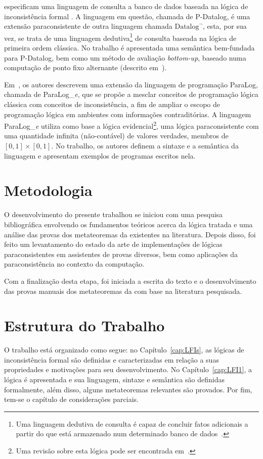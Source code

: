         
         especificam uma linguagem de consulta a banco de dados baseada na lógica de inconsistência formal \lfium{}. A linguagem em questão, chamada de P{-}Datalog, é uma extensão paraconsistente de outra linguagem chamada $\text{Datalog}^{\neg}$, esta, por sua vez, se trata de uma linguagem dedutiva\footnote{Uma linguagem dedutiva de consulta é capaz de concluir fatos adicionais a partir do que está armazenado num determinado banco de dados~\cite{datalog}.} de consulta baseada na lógica de primeira ordem clássica. No trabalho é apresentada uma semântica bem-fundada para P{-}Datalog, bem como um método de avaliação \textit{bottom{-}up}, baseado numa computação de ponto fixo alternante (descrito em~). 
        
        Em~, os autores descrevem uma extensão da linguagem de programação ParaLog, chamada de ParaLog\_\textit{e}, que se propõe a mesclar conceitos de programação lógica clássica com conceitos de inconsistência, a fim de ampliar o escopo de programação lógica em ambientes com informações contraditórias. A linguagem ParaLog\_\textit{e} utiliza como base a lógica evidencial\footnote{Uma revisão sobre esta lógica pode ser encontrada em~.}, uma lógica paraconsistente com uma quantidade infinita (não-contável) de valores verdades, membros de $[0,1] \times [0,1]$. No trabalho, os autores definem a sintaxe e a semântica da linguagem e apresentam exemplos de programas escritos nela.
    
    \section{Metodologia}\label{sec:metodologia}
      O desenvolvimento do presente trabalhou se iniciou com uma pesquisa bibliográfica envolvendo os fundamentos teóricos acerca da lógica tratada e uma análise das provas dos metateoremas da \lfium{} existentes na literatura. Depois disso, foi feito um levantamento do estado da arte de implementações de lógicas paraconsistentes em assistentes de provas diversos, bem como aplicações da paraconsistência no contexto da computação.

     Com a finalização desta etapa, foi iniciada a escrita do texto e o desenvolvimento das provas manuais dos metateoremas da \lfium{} com base na literatura pesquisada.
        

    \section{Estrutura do Trabalho}\label{sec:estrutura}
        O trabalho está organizado como segue: no Capítulo~\ref{cap:LFIs}, as lógicas de inconsistência formal são definidas e caracterizadas em relação a suas propriedades e motivações para seu desenvolvimento. No Capítulo~\ref{cap:LFI1}, a lógica \lfium{} é apresentada e sua linguagem, sintaxe e semântica são definidas formalmente, além disso, alguns metateoremas relevantes são provados. Por fim, tem-se o capítulo de considerações parciais.
        
    


       